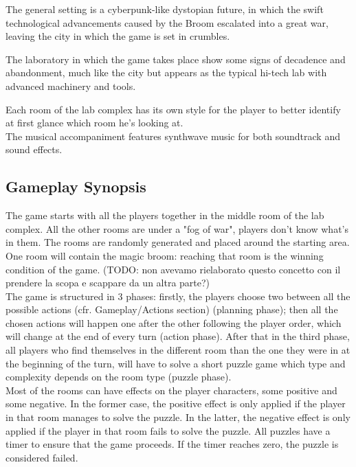 The general setting is a cyberpunk-like dystopian future, in which the swift technological advancements caused by the Broom escalated into a great war, leaving the city in which the game is set in crumbles.

The laboratory in which the game takes place show some signs of decadence and abandonment, much like the city but appears as the typical hi-tech lab with advanced machinery and tools.


Each room of the lab complex has its own style for the player to better identify at first glance which room he's looking at. \\

The musical accompaniment features synthwave music for both soundtrack and sound effects.

\clearpage 

\subsection{Gameplay Synopsis}

The game starts with all the players together in the middle room of the lab complex. All the other rooms are
under a "fog of war", players don't know what's in them. The rooms are randomly generated and placed
around the starting area. One room will contain the magic broom: reaching that room is the winning
condition of the game. (TODO: non avevamo rielaborato questo concetto con il prendere la scopa e scappare da un altra parte?) \\

The game is structured in 3 phases: firstly, the players choose two between all the possible actions (cfr. Gameplay/Actions section)  (planning phase);
then all the chosen actions will happen one after the other following the player order, which will change at the end of every turn (action phase). After that in the third phase, all players who find themselves in the different room than the one they were in at the beginning of the turn, will have to solve a short puzzle game which type and complexity depends on the room type (puzzle phase). \\

Most of the rooms can have effects on the player characters, some positive and some negative. In the former case, the positive effect is only applied if the player in that room manages to solve the puzzle. In the latter, the negative effect is only applied if the player in that room fails to solve the puzzle. All puzzles have a timer to ensure that the game proceeds. If the timer reaches zero, the puzzle is considered failed. 

\clearpage 